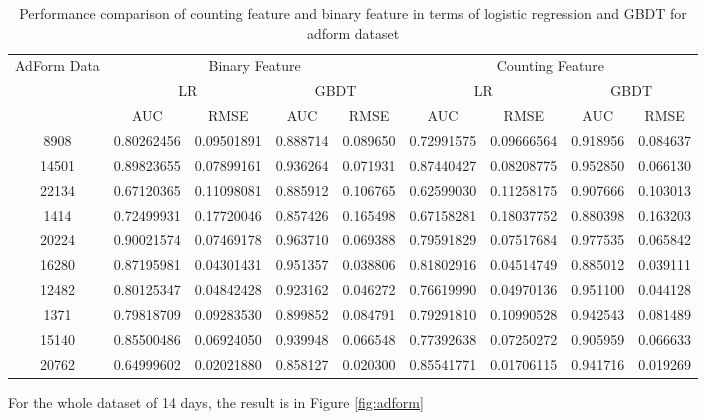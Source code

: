 \begin{table}
\tiny
\centering
  \begin{tabular}{|c|c|c|c|c|c|c|c|c|}
    \hline
    \multirow{3}{*}{AdForm Data} &
      \multicolumn{4}{c}{Binary Feature} &
      \multicolumn{4}{c|}{Counting Feature}  \\ 
      & \multicolumn{2}{c|}{LR} &
      \multicolumn{2}{c|}{GBDT} &
      \multicolumn{2}{c|}{LR} &
      \multicolumn{2}{c|}{GBDT} \\
    & AUC & RMSE & AUC & RMSE & AUC & RMSE & AUC & RMSE \\
    \hline
    8908 & 0.80262456 & 0.09501891 & 0.888714 & 0.089650 & 0.72991575& 0.09666564 & 0.918956 & 0.084637\\
    \hline
    14501 & 0.89823655 & 0.07899161 & 0.936264 & 0.071931 & 0.87440427 & 0.08208775 & 0.952850 & 0.066130\\
    \hline
    22134 & 0.67120365 & 0.11098081 & 0.885912 & 0.106765 & 0.62599030 & 0.11258175 & 0.907666 & 0.103013\\
    \hline
    1414 & 0.72499931 & 0.17720046 & 0.857426 & 0.165498 & 0.67158281 & 0.18037752 & 0.880398 & 0.163203\\
    \hline
    20224 & 0.90021574 & 0.07469178 & 0.963710 & 0.069388 & 0.79591829 & 0.07517684 & 0.977535 & 0.065842\\
    \hline
    16280 & 0.87195981 & 0.04301431 & 0.951357 & 0.038806 & 0.81802916 & 0.04514749 & 0.885012 & 0.039111	\\
    \hline
    12482 & 0.80125347 & 0.04842428 & 0.923162 & 0.046272 & 0.76619990 & 0.04970136 & 0.951100& 0.044128\\
    \hline
    1371 & 0.79818709 & 0.09283530 & 0.899852 & 0.084791 & 0.79291810 & 0.10990528 & 0.942543 & 0.081489\\
    \hline
    15140 & 0.85500486 & 0.06924050 & 0.939948 & 0.066548 & 0.77392638 & 0.07250272 & 0.905959 & 0.066633\\
    \hline
    20762 & 0.64999602 & 0.02021880 & 0.858127 & 0.020300 & 0.85541771 & 0.01706115 & 0.941716 & 0.019269\\
    \hline
  \end{tabular}
  \caption{Performance comparison of counting feature and binary feature in terms of logistic regression and GBDT for adform dataset}
 \label{tab:adform}
\end{table}

For the whole dataset of 14 days, the result is in Figure \ref{fig:adform}

